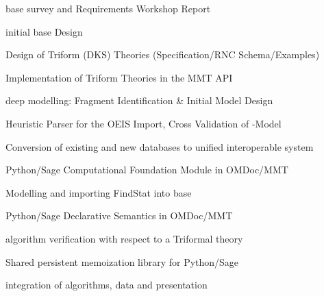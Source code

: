 \begin{workpackage}[id=dksbases,%
  title=Data/Knowledge/Software-Bases,lead=JU,
  ZHRM=12,JURM=36,UWRM=25,SARM=10,LLRM=2,PSRM=4]
\begin{wpdelivs}
  \begin{wpdeliv}[due=9,id=wsrep,dissem=PU,nature=R,lead=JU]{\DKS base survey and
      Requirements Workshop Report}
  \end{wpdeliv}
  \begin{wpdeliv}[due=12,id=design,dissem=PU,nature=R,lead=JU]
        {initial \DKS base Design}
   \end{wpdeliv}
  \begin{wpdeliv}[due=15,id=dkstheories,dissem=PU,nature=R,lead=JU]
        {Design of Triform (DKS) Theories (Specification/RNC Schema/Examples)}
  \end{wpdeliv}
  \begin{wpdeliv}[due=15,id=dksimp,dissem=PU,nature=OTHER,lead=JU]
        {Implementation of Triform Theories in the MMT API}
  \end{wpdeliv}
  \begin{wpdeliv}[due=18,id=lmfmod,dissem=PU,nature=R,lead=ZH]
      {\LMFDB deep modelling: Fragment Identification \& Initial Model Design}
  \end{wpdeliv}
  \begin{wpdeliv}[due=20,id=oeisparser,dissem=PU,nature=OTHER,lead=JU]
      {Heuristic Parser for the OEIS Import, Cross Validation of \DKS-Model}
  \end{wpdeliv}
  \begin{wpdeliv}[due=24,id=conv,dissem=PU,nature=DEC,lead=ZH]
        {Conversion of existing and new databases to unified interoperable system}
   \end{wpdeliv}
  \begin{wpdeliv}[due=24,id=psfoundation,dissem=PU,nature=OTHER,lead=JU]
        {Python/Sage Computational Foundation Module in OMDoc/MMT}
  \end{wpdeliv}
  \begin{wpdeliv}[due=30,id=findstat,dissem=PU,nature=OTHER,lead=JU]
      {Modelling and importing FindStat into \DKS base}
  \end{wpdeliv}
  \begin{wpdeliv}[due=36,id=pssem,dissem=PU,nature=OTHER,lead=JU]
      {Python/Sage Declarative Semantics in OMDoc/MMT}
  \end{wpdeliv}
  \begin{wpdeliv}[due=36,id=lfmverif,dissem=PU,nature=OTHER,lead=JU]
      {\LMFDB algorithm verification with respect to a Triformal theory}
  \end{wpdeliv}
  \begin{wpdeliv}[due=42,id=persistent-memoization,dissem=PU,nature=OTHER,lead=SA]
    {Shared persistent memoization library for Python/Sage} 
  \end{wpdeliv}
  \begin{wpdeliv}[due=48,id=lfmint,dissem=PU,nature=R,lead=JU]
      {\LMFDB integration of algorithms, data and presentation}
  \end{wpdeliv}
\end{wpdelivs}


\end{workpackage}
